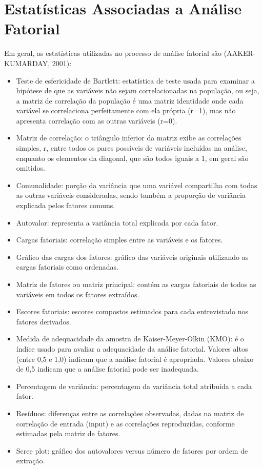 \documentclass[12pt,brazil,oneside]{book}
\begin{document}
\hypertarget{estatisticas-associadas-a-analise-fatorial}{%
\section{Estatísticas Associadas a Análise
Fatorial}\label{estatisticas-associadas-a-analise-fatorial}}

Em geral, as estatísticas utilizadas no processo de análise fatorial são
(AAKER-KUMARDAY, 2001):

\begin{itemize}
\item
  Teste de esfericidade de Bartlett: estatística de teste usada para
  examinar a hipótese de que as variáveis não sejam correlacionadas na
  população, ou seja, a matriz de correlação da população é uma matriz
  identidade onde cada variável se correlaciona perfeitamente com ela
  própria (r=1), mas não apresenta correlação com as outras variáveis
  (r=0).
\item
  Matriz de correlação: o triângulo inferior da matriz exibe as
  correlações simples, r, entre todos os pares possíveis de variáveis
  incluídas na análise, enquanto os elementos da diagonal, que são todos
  iguais a 1, em geral são omitidos.
\item
  Comunalidade: porção da variância que uma variável compartilha com
  todas as outras variáveis consideradas, sendo também a proporção de
  variância explicada pelos fatores comuns.
\item
  Autovalor: representa a variância total explicada por cada fator.
\item
  Cargas fatoriais: correlação simples entre as variáveis e os fatores.
\item
  Gráfico das cargas dos fatores: gráfico das variáveis originais
  utilizando as cargas fatoriais como ordenadas.
\item
  Matriz de fatores ou matriz principal: contém as cargas fatoriais de
  todos as variáveis em todos os fatores extraídos.
\item
  Escores fatoriais: escores compostos estimados para cada entrevistado
  nos fatores derivados.
\item
  Medida de adequacidade da amostra de Kaiser-Meyer-Olkin (KMO): é o
  índice usado para avaliar a adequacidade da análise fatorial. Valores
  altos (entre 0,5 e 1,0) indicam que a análise fatorial é apropriada.
  Valores abaixo de 0,5 indicam que a análise fatorial pode ser
  inadequada.
\item
  Percentagem de variância: percentagem da variância total atribuída a
  cada fator.
\item
  Resíduos: diferenças entre as correlações observadas, dadas na matriz
  de correlação de entrada (input) e as correlações reproduzidas,
  conforme estimadas pela matriz de fatores.
\item
  Scree plot: gráfico dos autovalores versus número de fatores por ordem
  de extração.
\end{itemize}
\end{document}

